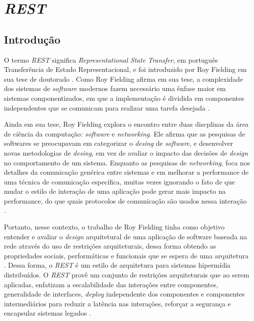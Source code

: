 \section{\textit{REST}}

\subsection{Introdução} \label{rest_intro}

	O termo \textit{REST} significa \textit{Representational State Transfer}, em português Transferência de Estado Representacional, e foi introduzido por Roy Fielding em sua tese de doutorado \cite{fielding2000architectural}. Como Roy Fielding afirma em sua tese, a complexidade dos sistemas de \textit{software} modernos fazem necessário uma ênfase maior  em sistemas componentizados, em que a implementação é dividida em componentes independentes que se comunicam para realizar uma tarefa desejada \cite{fielding2000architectural}.
	
	Ainda em sua tese, Roy Fielding explora o encontro entre duas discplinas da área de ciência da computação: \textit{software} e \textit{networking}. Ele afirma que as pesquisas de softwares se preocupavam em categorizar o \textit{desing} de \textit{software}, e desenvolver novas metodologias de \textit{desing}, em vez de avaliar o impacto das decisões de \textit{design} no comportamento de um sistema. Enquanto as pesquisas de \textit{networking}, foca nos detalhes da comunicação genérica entre sistemas e em melhorar a performance de uma técnica de comunicação específica, muitas vezes ignorando o fato de que mudar o estilo de interação de uma aplicação pode gerar mais impacto na performance, do que quais protocolos de comunicação são usados nessa interação \cite{fielding2000architectural}.
	
	Portanto, nesse contexto, o trabalho de Roy Fielding tinha como objetivo entender e avaliar o \textit{design} arquitetural de uma aplicação de software baseada na rede através do uso de restrições arquiteturais, dessa forma obtendo as propriedades sociais, performáticas e funcionais que se espera de uma arquitetura \cite{fielding2000architectural}. Dessa forma, o \textit{REST} é um estilo de arquitetura para sistemas hipermídia distribuídos. O \textit{REST} provê um conjunto de restrições arquiteturais que ao serem aplicadas, enfatizam a escalabilidade das interações entre componentes, generalidade de interfaces, \textit{deploy} independente dos componentes e componentes intermediários para reduzir a latência nas interações, reforçar a segurança e encapsular sistemas legados \cite{fielding2000architectural}.
	
